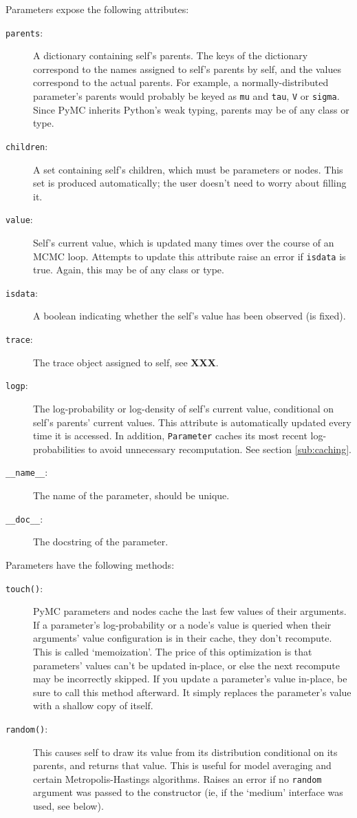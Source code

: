 \documentclass[]{book}
\begin{document}
Parameters expose the following attributes:
\begin{description}
    \item[\texttt{parents}:] A dictionary containing self's parents. The keys of the dictionary correspond to the names assigned to self's parents by self, and the values correspond to the actual parents. For example, a normally-distributed parameter's parents would probably be keyed as \texttt{mu} and \texttt{tau}, \texttt{V} or \texttt{sigma}. Since PyMC inherits Python's weak typing, parents may be of any class or type.
    \item[\texttt{children}:] A set containing self's children, which must be parameters or nodes. This set is produced automatically; the user doesn't need to worry about filling it.
    \item[\texttt{value}:] Self's current value, which is updated many times over the course of an MCMC loop. Attempts to update this attribute raise an error if \texttt{isdata} is true. Again, this may be of any class or type.
    \item[\texttt{isdata}:] A boolean indicating whether the self's value has been observed (is fixed).
    \item[\texttt{trace}:] The trace object assigned to self, see \textbf{XXX}.
    \item[\texttt{logp}:] The log-probability or log-density of self's current value, conditional on self's parents' current values. This attribute is automatically updated every time it is accessed. In addition, \texttt{Parameter} caches its most recent log-probabilities to avoid unnecessary recomputation. See section \ref{sub:caching}.
    \item[\texttt{\_\_name\_\_}:] The name of the parameter, should be unique.
    \item[\texttt{\_\_doc\_\_}:] The docstring of the parameter.
\end{description}

Parameters have the following methods:
\begin{description}
	\item[\texttt{touch()}:] PyMC parameters and nodes cache the last few values of their arguments. If a parameter's log-probability or a node's value is queried when their arguments' value configuration is in their cache, they don't recompute. This is called `memoization'. The price of this optimization is that parameters' values can't be updated in-place, or else the next recompute may be incorrectly skipped. If you update a parameter's value in-place, be sure to call this method afterward. It simply replaces the parameter's value with a shallow copy of itself.
    \item[\texttt{random()}:] This causes self to draw its value from its distribution conditional on its parents, and returns that value. This is useful for model averaging and certain Metropolis-Hastings algorithms. Raises an error if no \texttt{random} argument was passed to the constructor (ie, if the `medium' interface was used, see below).
\end{description}
\end{document}

